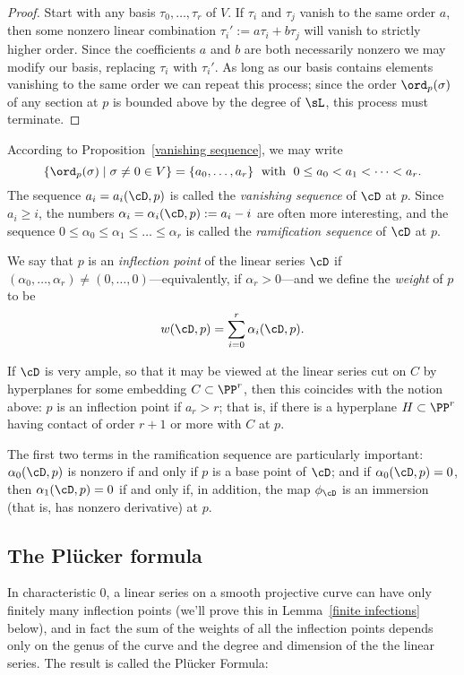 \begin{proof} Start with any basis $\tau_0, \dots, \tau_r$ of $V$. If  $\tau_i$ and $\tau_j$ vanish to the same order $a$, then 
some nonzero linear combination $\tau_i' := a\tau_i+b\tau_j$  will vanish to strictly higher order. Since the coefficients $a$ and $b$ are both necessarily nonzero we may modify our basis, replacing $\tau_i$ with $\tau_i'$. As long as our basis contains elements vanishing to the same order we can repeat this process; since the order $\ord_p(\sigma)$ of any section at $p$ is bounded above by the degree of $\sL$, this process must terminate.
\end{proof}

According to  Proposition~\ref{vanishing sequence}, we may write
$$
\{ \ord_p(\sigma) \mid \sigma \neq 0 \in V \} = \{a_0,\dots,a_r\} \; \text{ with } \; 0\leq a_0 < a_1 < \dots < a_r.
$$
The sequence $a_i = a_i(\cD,p)$ is called the \emph{vanishing sequence} of $\cD$ at $p$.  Since $a_i \geq i$, the numbers $\alpha_i = \alpha_i(\cD,p) := a_i - i$ are often more interesting, and the sequence $0 \leq \alpha_0 \leq \alpha_1 \leq \dots \leq \alpha_r$ is called the \emph{ramification sequence} of $\cD$ at $p$. 

We say that $p$ is an \emph{inflection point} of the linear series $\cD$ if $(\alpha_0,\dots,\alpha_r) \neq (0,\dots,0)$---equivalently, if $\alpha_r > 0$---and we define the \emph{weight} of $p$ to be
$$
w(\cD, p) = \sum_{i=0}^r \alpha_i(\cD, p).
$$

If $\cD$ is very ample, so that it may be viewed at the linear series cut on $C$ by hyperplanes for some embedding $C \subset \PP^r$, then this coincides with the notion above: $p$ is an inflection point if $a_r > r$; that is, if there is a hyperplane $H \subset \PP^r$ having contact of order $r+1$ or more with $C$ at $p$.

The first two terms in the ramification sequence are particularly important: $\alpha_0(\cD, p)$ is nonzero if and only if $p$ is a base point of $\cD$; and if $\alpha_0(\cD, p)=0$, then $\alpha_1(\cD, p) = 0$ if and only if, in addition, the map $\phi_\cD$ is an immersion (that is, has nonzero derivative) at $p$.


\subsection{The Pl\"ucker formula}

In characteristic 0, a linear series on a smooth projective curve can have only finitely many inflection points (we'll prove this in Lemma~\ref{finite infections} below), and in fact the sum of the weights of all the inflection points depends only on the genus of the curve and the degree and dimension of the the linear series. The result is called the Pl\"ucker Formula:

